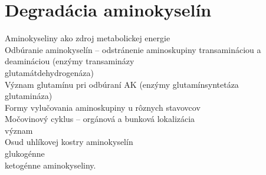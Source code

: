\section{Degradácia aminokyselín}
Aminokyseliny ako zdroj metabolickej energie\\
Odbúranie aminokyselín -- odstránenie aminoskupiny transamináciou a deamináciou (enzýmy transaminázy\\
\tab glutamátdehydrogenáza)\\
Význam glutamínu pri odbúraní AK (enzýmy glutamínsyntetáza\\
\tab glutamináza)\\
Formy vylučovania aminoskupiny u rôznych stavovcov\\
Močovinový cyklus -- orgánová a bunková lokalizácia\\
\tab význam\\
Osud uhlíkovej kostry aminokyselín\\
\tab glukogénne\\
\tab ketogénne aminokyseliny.\\

